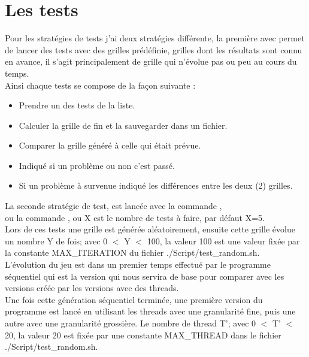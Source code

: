 \documentclass[10pt,a4paper]{article}
\begin{document}
\section{Les tests}
Pour les stratégies de tests j'ai deux stratégies différente, la première avec  permet de lancer des tests avec des grilles prédéfinie, grilles dont les résultats sont connu en avance, il s'agit principalement de grille qui n'évolue pas ou peu au cours du temps. \\

Ainsi chaque tests se compose de la façon suivante : 
\begin{itemize}
    \item Prendre un des tests de la liste.
    \item Calculer la grille de fin et la sauvegarder dans un fichier.
    \item Comparer la grille généré à celle qui était prévue.
    \item Indiqué si un problème ou non c'est passé.
    \item Si un problème à survenue indiqué les différences entre les deux (2) grilles.
\end{itemize}

\hfill \break

La seconde stratégie de test, est lancée avec la commande , \\
ou la commande , ou X est le nombre de tests à faire, par défaut X=5. \\

Lors de ces tests une grille est générée aléatoirement, ensuite cette grille évolue un nombre Y de fois; avec 0 $<$ Y $<$ 100, la valeur 100 est une valeur fixée par la constante MAX\_ITERATION du fichier ./Script/test\_random.sh. \\

L'évolution du jeu est dans un premier temps effectué par le programme séquentiel qui est la version qui nous servira de base pour comparer avec les versions créée par les versions avec des threads. \\
Une fois cette génération séquentiel terminée, une première version du programme est lancé en utilisant les threads avec une granularité fine, puis une autre avec une granularité grossière. Le nombre de thread T'; avec 0 $<$ T' $<$ 20, la valeur 20 est fixée par une constante MAX\_THREAD dans le fichier ./Script/test\_random.sh. \\
\end{document}
